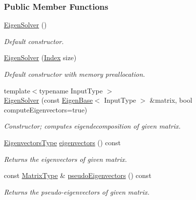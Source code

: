 \subsubsection*{Public Member Functions}
\begin{DoxyCompactItemize}
\item 
\hyperlink{group___eigenvalues___module_a3af22d721a6401365881b2ef252d26aa}{Eigen\+Solver} ()
\begin{DoxyCompactList}\small\item\em Default constructor. \end{DoxyCompactList}\item 
\hyperlink{group___eigenvalues___module_aa4edf56ecc178b277b75c13a2ca1089f}{Eigen\+Solver} (\hyperlink{group___eigenvalues___module_a5bff6a6bc0efac67d52c60c2c3deb9ee}{Index} size)
\begin{DoxyCompactList}\small\item\em Default constructor with memory preallocation. \end{DoxyCompactList}\item 
{\footnotesize template$<$typename Input\+Type $>$ }\\\hyperlink{group___eigenvalues___module_a7e8ab3d89ea525af5f27f1a8e805fae1}{Eigen\+Solver} (const \hyperlink{group___core___module_struct_eigen_1_1_eigen_base}{Eigen\+Base}$<$ Input\+Type $>$ \&matrix, bool compute\+Eigenvectors=true)
\begin{DoxyCompactList}\small\item\em Constructor; computes eigendecomposition of given matrix. \end{DoxyCompactList}\item 
\hyperlink{group___eigenvalues___module_aa140354e2f7d5ce34c6488c39e19f2c2}{Eigenvectors\+Type} \hyperlink{group___eigenvalues___module_a66288022802172e3ee059283b26201d7}{eigenvectors} () const
\begin{DoxyCompactList}\small\item\em Returns the eigenvectors of given matrix. \end{DoxyCompactList}\item 
const \hyperlink{group___eigenvalues___module_a83acd180404ddaac8a678fa65a6b632b}{Matrix\+Type} \& \hyperlink{group___eigenvalues___module_a4e796226f06e1f7347cf03a38755a155}{pseudo\+Eigenvectors} () const
\begin{DoxyCompactList}\small\item\em Returns the pseudo-\/eigenvectors of given matrix. \end{DoxyCompactList}\item 

\end{DoxyCompactItemize}
